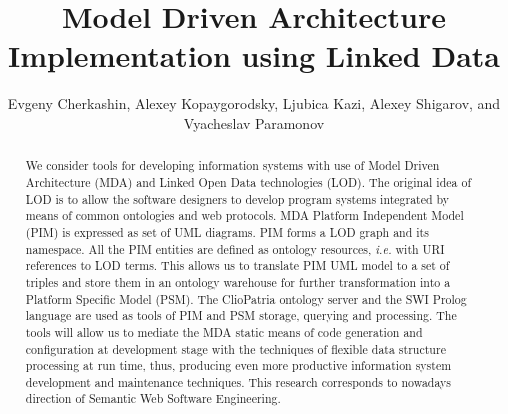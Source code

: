 \documentclass[runningheads]{llncs}
\begin{document}


\date{}
\title{Model Driven Architecture Implementation using Linked Data}

\author{%
  Evgeny Cherkashin,
Alexey Kopaygorodsky,
Ljubica Kazi,
Alexey Shigarov,
and
Vyacheslav Paramonov
}

\maketitle

\begin{abstract}
We consider tools for developing information systems with use of Model Driven Architecture (MDA) and Linked Open Data technologies (LOD).  The original idea of LOD is to allow the software designers to develop program systems integrated by means of common ontologies and web protocols.  MDA Platform Independent Model (PIM) is expressed as set of UML diagrams.  PIM forms a LOD graph and its namespace.  All the PIM entities are defined as ontology resources, \emph{i.e.} with URI references to LOD terms.  This allows us to translate PIM UML model to a set of triples and store them in an ontology warehouse for further transformation into a Platform Specific Model (PSM).  The ClioPatria ontology server and the SWI Prolog language are used as tools of PIM and PSM storage, querying and processing.
The tools will allow us to mediate the MDA static means of code generation and configuration at development stage with the techniques of flexible data structure processing at run time, thus, producing even more productive information system development and maintenance techniques.  This research corresponds to nowadays direction of Semantic Web Software Engineering.
\end{abstract}
\end{document}
